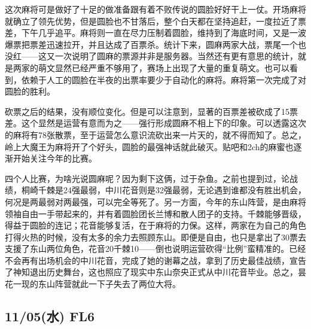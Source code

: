 这次麻将可是做好了十足的做准备跟有着不败传说的圆脸好好干上一仗。开场麻将就确立了领先优势，但是圆脸也不甘落后，整个白天都在坚持追赶，一度拉近了票差，下午几乎追平。麻将则一直在尽力压制着圆脸，维持到了海底时间，又是一波爆票把票差迅速拉开，并且达成了百票杀。统计下来，圆麻两家大战，票尾一个也没红——这又一次说明了圆麻的票源并非是服务器。当然还有更有意思的统计，就是两家的萌文显然已经严重不够用了，赛场上出现了大量的重复萌文。也可以看到，依赖于人工的圆脸在半夜的出票率要少于自动化的麻将。麻将第一次完成了对圆脸的胜利。

砍票之后的结果，没有顺位变化。但是可以注意到，显著的百票差被砍成了15票差。这个显然是运营有意而为之——强行形成圆麻不相上下的印象。可以透露这次的麻将有78张散票，至于运营怎么意识流砍出来一片天的，就不得而知了。总之，岭上大魔王为麻将开了个好头，圆脸的最强神话就此破灭。贴吧和2ch的麻蜜也逐渐开始关注今年的比赛。

四个人比赛，为啥光说圆麻呢？因为剩下这俩，过于杂鱼。之前也提到过，论战绩，桐崎千棘是24强最弱，中川花音则是32强最弱，无论遇到谁都没有胜出机会，何况是两最弱对两最强，可以完全等死了。另一方面，今年的东山阵营，是由麻将领袖自由一手带起来的，并有着圆脸团长兰博和散人团子的支持。千棘能够晋级，得益于圆脸的连记；花音能够复活，在于麻将的力保。这样，两家在为自己的角色打得火热的时候，没有太多的余力去照顾东山。即便是自由，也只是拿出了30票去支援了东山两位角色，花音20千棘10——倒也说明运营砍得“比例”蛮精准的。已经不会再有出场机会的中川花音，完成了她的谢幕之战，拿到了历史最佳战绩，宣告了神知退出历史舞台，这也照应了现实中东山奈央正式从中川花音毕业。总之，昙花一现的东山阵营就此一下子失去了两位大将。

\subsection{11/05(水) FL6}


